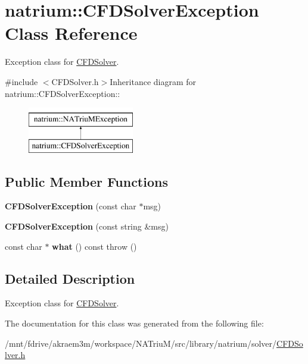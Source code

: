 \hypertarget{classnatrium_1_1CFDSolverException}{
\section{natrium::CFDSolverException Class Reference}
\label{classnatrium_1_1CFDSolverException}
}


Exception class for \hyperlink{classnatrium_1_1CFDSolver}{CFDSolver}.  


{\ttfamily \#include $<$CFDSolver.h$>$}Inheritance diagram for natrium::CFDSolverException::\begin{figure}[H]
\begin{center}
\leavevmode
\includegraphics[height=2cm]{classnatrium_1_1CFDSolverException}
\end{center}
\end{figure}
\subsection*{Public Member Functions}
\begin{DoxyCompactItemize}
\item 
\hypertarget{classnatrium_1_1CFDSolverException_a1256570132b679d57fe046f648656051}{
{\bfseries CFDSolverException} (const char $\ast$msg)}
\label{classnatrium_1_1CFDSolverException_a1256570132b679d57fe046f648656051}

\item 
\hypertarget{classnatrium_1_1CFDSolverException_a1fc20604a6925cd3577fe3fa7c0f585e}{
{\bfseries CFDSolverException} (const string \&msg)}
\label{classnatrium_1_1CFDSolverException_a1fc20604a6925cd3577fe3fa7c0f585e}

\item 
\hypertarget{classnatrium_1_1CFDSolverException_ae1e5d3d088b808ab4c995d1209a86a1f}{
const char $\ast$ {\bfseries what} () const   throw ()}
\label{classnatrium_1_1CFDSolverException_ae1e5d3d088b808ab4c995d1209a86a1f}

\end{DoxyCompactItemize}


\subsection{Detailed Description}
Exception class for \hyperlink{classnatrium_1_1CFDSolver}{CFDSolver}. 

The documentation for this class was generated from the following file:\begin{DoxyCompactItemize}
\item 
/mnt/fdrive/akraem3m/workspace/NATriuM/src/library/natrium/solver/\hyperlink{CFDSolver_8h}{CFDSolver.h}\end{DoxyCompactItemize}
